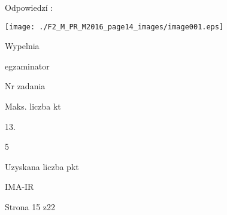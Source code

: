\documentclass[a4paper,12pt]{article}
\begin{document}
Odpowiedzí :
\begin{center}
\texttt{[image: ./F2\_M\_PR\_M2016\_page14\_images/image001.eps]}
\end{center}
Wypelnia

egzaminator

Nr zadania

Maks. liczba kt

13.

5

Uzyskana liczba pkt

IMA-IR

Strona 15 z22
\end{document}
